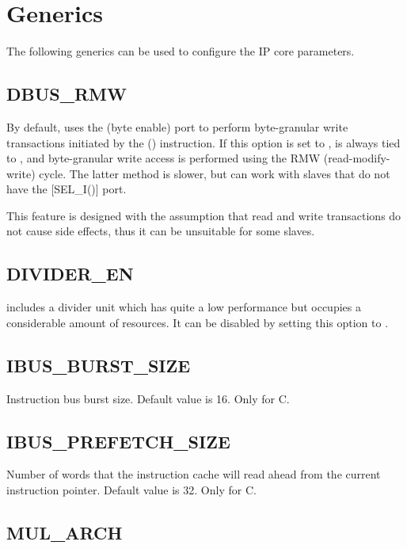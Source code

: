 \documentclass[a4paper,12pt,twoside,extrafontsizes]{memoir}
\begin{document}
\section{Generics}
\label{sec:generics}

The following generics can be used to configure the \lxp{} IP core parameters.

\subsection{DBUS\_RMW}

By default, \lxp{} uses the  (byte enable) port to perform byte-granular write transactions initiated by the  () instruction. If this option is set to ,  is always tied to , and byte-granular write access is performed using the RMW (read-modify-write) cycle. The latter method is slower, but can work with slaves that do not have the [SEL\_I()] port.

This feature is designed with the assumption that read and write transactions do not cause side effects, thus it can be unsuitable for some slaves.

\subsection{DIVIDER\_EN}

\lxp{} includes a divider unit which has quite a low performance but occupies a considerable amount of resources. It can be disabled by setting this option to .

\subsection{IBUS\_BURST\_SIZE}

Instruction bus burst size. Default value is 16. Only for \lxp{}C.

\subsection{IBUS\_PREFETCH\_SIZE}

Number of words that the instruction cache will read ahead from the current instruction pointer. Default value is 32. Only for \lxp{}C.

\subsection{MUL\_ARCH}
\end{document}
